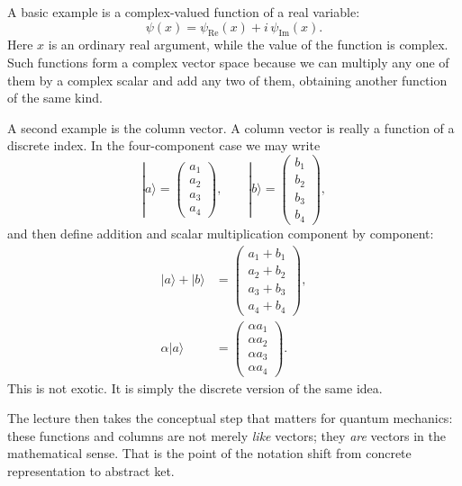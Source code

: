 A basic example is a complex-valued function of a real variable:
\begin{equation}
\psi(x) = \psi_{\mathrm{Re}}(x) + i\,\psi_{\mathrm{Im}}(x).
\end{equation}
Here \(x\) is an ordinary real argument, while the value of the function is complex. Such functions form a complex vector space because we can multiply any one of them by a complex scalar and add any two of them, obtaining another function of the same kind.

A second example is the column vector. A column vector is really a function of a discrete index. In the four-component case we may write
\begin{equation}
|a\rangle
=
\left(
\begin{array}{c}
a_1\\
a_2\\
a_3\\
a_4
\end{array}
\right),
\qquad
|b\rangle
=
\left(
\begin{array}{c}
b_1\\
b_2\\
b_3\\
b_4
\end{array}
\right),
\end{equation}
and then define addition and scalar multiplication component by component:
\begin{align}
|a\rangle + |b\rangle
&=
\left(
\begin{array}{c}
a_1+b_1\\
a_2+b_2\\
a_3+b_3\\
a_4+b_4
\end{array}
\right),\\
\alpha |a\rangle
&=
\left(
\begin{array}{c}
\alpha a_1\\
\alpha a_2\\
\alpha a_3\\
\alpha a_4
\end{array}
\right).
\end{align}
This is not exotic. It is simply the discrete version of the same idea.

The lecture then takes the conceptual step that matters for quantum mechanics: these functions and columns are not merely \emph{like} vectors; they \emph{are} vectors in the mathematical sense. That is the point of the notation shift from concrete representation to abstract ket.

